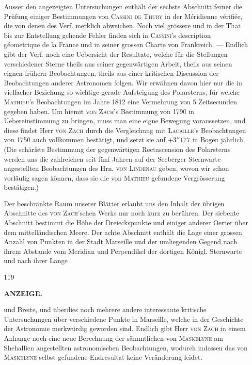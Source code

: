 Ausser den angezeigten Untersuchungen enthält der sechste Abschnitt ferner die Prüfung einiger Bestimmungen von \textsc{Cassini de Thury} in der Méridienne vérifiée, die von denen des Verf. merklich abweichen. Noch viel grössere und in der That bis zur Entstellung gehende Fehler finden sich in \textsc{Cassini}'s description géometrique de la France und in seiner grossen Charte von Frankreich. --- Endlich gibt der Verf. noch eine Uebersicht der Resultate, welche für die Stellungen verschiedener Sterne theils aus seiner gegenwärtigen Arbeit, theils aus seinen eignen frühern Beobachtungen, theils aus einer kritischen Discussion der Beobachtungen anderer Astronomen folgen. Wir erwähnen davon hier nur die in vielfacher Beziehung so wichtige gerade Aufsteigung des Polarsterns, für welche \textsc{Mathieu}'s Beobachtungen im Jahre 1812 eine Vermehrung von 5 Zeitsecunden gegeben haben. Um hiemit \textsc{von Zach}'s Bestimmung von 1790 in Uebereinstimmung zu bringen, muss man eine eigne Bewegung voraussetzen, und diese findet Herr \textsc{von Zach} durch die Vergleichung mit \textsc{Lacaille}'s Beobachtungen von 1750 auch vollkommen bestätigt, und setzt sie auf $+3''177$ in Bogen jährlich. (Die schärfste Bestimmung der gegenwärtigen Rectascension des Polarsterns werden uns die zahlreichen seit fünf Jahren auf der Seeberger Sternwarte angestellten Beobachtungen des Hrn. \textsc{von Lindenau} geben, wovon wir schon vorläufig sagen können, dass sie die von \textsc{Mathieu} gefundene Vergrösserung bestätigen.)

Der beschränkte Raum unserer Blätter erlaubt uns den Inhalt der übrigen Abschnitte des \textsc{von Zach}'schen Werks nur noch kurz zu berühren. Der siebente Abschnitt bestimmt die Höhe der Dreieckspunkte und einiger anderer Oerter über dem mittelländischen Meere. Der achte Abschnitt enthält die Lage einer grossen Anzahl von Punkten in der Stadt Marseille und der umliegenden Gegend nach ihrem Abstande vom Meridian und Perpendikel der dortigen Königl. Sternwarte und nach ihrer Länge\par
\vfill
{}\hfill{\small 119}\hspace*{.18\textwidth}\par
\clearpage
{}
\noindent{}%
\parbox[b]{\dimexpr\textwidth-20mm\relax}{\centering\small\textbf{ANZEIGE.}}%
\makebox[10mm][r]{}\par\nobreak\medskip
\noindent und Breite, und überdies noch mehrere andere interessante kritische Untersuchungen über
verschiedene Punkte in Marseille, welche in der Geschichte der Astronomie merkwürdig geworden
sind. Endlich gibt Herr \textsc{von Zach} in einem Anhange noch eine neue Berechnung der
sämmtlichen von \textsc{Maskelyne} am Shehallien angestellten astronomischen Beobachtungen,
wodurch indessen das von \textsc{Maskelyne} selbst gefundene Endresultat keine Veränderung
leidet.
